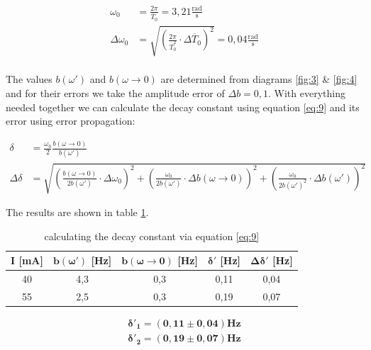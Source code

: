 \documentclass{article}
\begin{document}
\begin{equation}
    \begin{split}
        \omega_0 &= \frac{2\pi}{\overline{T}_0} = 3,21 \frac{\text{rad}}{\text{s}}\\
        \Delta \omega_0 &= \sqrt{\left( \frac{2\pi}{\overline{T}_0^2} \cdot \Delta \overline{T}_0 \right)^2} = 0,04 \frac{\text{rad}}{\text{s}}\\
    \end{split}
\end{equation}

The values $b(\omega')$ and $b(\omega \rightarrow 0)$ are determined from diagrams \ref{fig:3} \& \ref{fig:4} and for their errors we take the amplitude error of $\Delta b = 0,1$. With everything needed together we can calculate the decay constant using equation \ref{eq:9} and its error using error propagation:


\begin{equation}
    \begin{split}
        \delta &= \frac{\omega_0}{2} \frac{b(\omega \rightarrow 0)}{b(\omega')} \\
        \Delta \delta &= \sqrt{\left( \frac{b(\omega \rightarrow 0)}{2b(\omega')} \cdot \Delta \omega_0 \right)^2 + \left( \frac{\omega_0}{2b(\omega')} \cdot \Delta b(\omega \rightarrow 0) \right)^2 + \left( \frac{\omega_0}{2b(\omega')^2} \cdot \Delta b(\omega') \right)^2}
    \end{split}
\end{equation}

The results are shown in table \ref{tab:2}.

\begin{table} [!ht]
    \centering
    \caption{calculating the decay constant via equation \ref{eq:9}}
    \bigskip
    \begin{tabular}{ccccc}
        \hline
        $\bm{I}$ [mA] & $\bm{b(\omega')}$ [Hz] & $\bm{b(\omega \rightarrow 0)}$ [Hz] & $\bm{\delta'}$ [Hz] & $\bm{\Delta \delta'}$ [Hz] \\ \hline
        40 & 4,3 & 0,3 & 0,11 & 0,04 \\
        55 & 2,5 & 0,3 & 0,19 & 0,07 \\ \hline
    \end{tabular}
    \label{tab:2}
\end{table}

\begin{equation}
    \begin{split}
        \bm{\delta'_1} = \bm{(0,11 \pm 0,04)} \textbf{Hz} \\
        \bm{\delta'_2} = \bm{(0,19 \pm 0,07)} \textbf{Hz} \\
    \end{split}
\end{equation}
\end{document}
